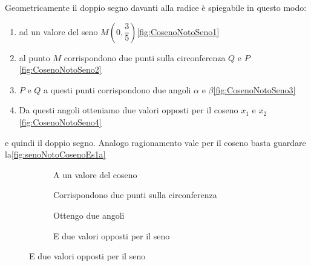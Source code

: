 Geometricamente il doppio segno davanti alla radice è spiegabile in questo modo:
\begin{enumerate}
	\item ad un valore del seno $M(0,\dfrac{3}{5})$\nobs\vref{fig:CosenoNotoSeno1}
	\item al punto $M$ corrispondono due punti sulla circonferenza $Q$ e $P$\nobs\vref{fig:CosenoNotoSeno2}
	\item $P$ e $Q$ a questi punti corrispondono due angoli $\alpha$ e $\beta$\nobs\vref{fig:CosenoNotoSeno3}
	\item Da questi angoli otteniamo due valori opposti per il coseno $x_1$ e $x_2$\nobs\vref{fig:CosenoNotoSeno4}
	\end{enumerate}
e quindi il doppio segno.
Analogo ragionamento vale per il coseno basta guardare la\nobs\vref{fig:senoNotoCosenoEs1a}

\begin{figure}
	\begin{subfigure}[b]{.5\linewidth}
		\centering
	\caption{A un valore del coseno}\label{fig:senoNotoCoseno1}
	\end{subfigure}%
	\begin{subfigure}[b]{.5\linewidth}
		\centering
		\caption{Corrispondono due punti sulla circonferenza}\label{fig:senoNotoCoseno2}
	\end{subfigure}
	\begin{subfigure}[b]{.5\linewidth}
		\centering
		\caption{Ottengo due angoli}\label{fig:senoNotoCoseno3}
	\end{subfigure}%
	\begin{subfigure}[b]{.5\linewidth}
		\centering
		\caption{E due valori opposti per il seno}\label{fig:senoNotoCoseno4}
	\end{subfigure}
	\label{fig:senoNotoCosenoEs1a}
\end{figure}
